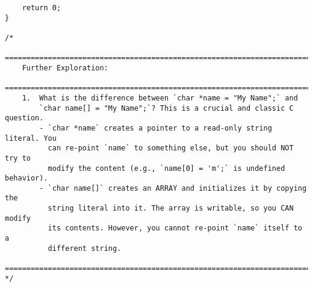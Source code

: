 \documentclass[11pt]{book}
\begin{document}
\begin{verbatim}
    return 0;
}

/*
    ================================================================================
    Further Exploration:
    ================================================================================
    1.  What is the difference between `char *name = "My Name";` and
        `char name[] = "My Name";`? This is a crucial and classic C question.
        - `char *name` creates a pointer to a read-only string literal. You
          can re-point `name` to something else, but you should NOT try to
          modify the content (e.g., `name[0] = 'm';` is undefined behavior).
        - `char name[]` creates an ARRAY and initializes it by copying the
          string literal into it. The array is writable, so you CAN modify
          its contents. However, you cannot re-point `name` itself to a
          different string.
    ================================================================================
*/

\end{verbatim}
\end{document}
